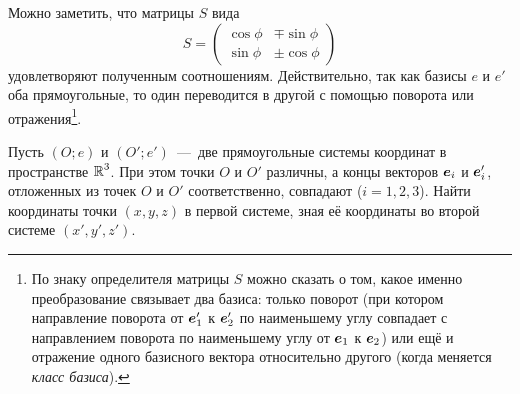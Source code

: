 \documentclass[a4paper,12pt]{article}
\begin{document}
\begin{solution}
    Можно заметить, что матрицы $S$ вида
    \[
      S = \begin{pmatrix}
        \cos \phi & \mp \sin \phi\\
        \sin \phi & \pm \cos \phi
      \end{pmatrix}
    \]
    удовлетворяют полученным соотношениям.
    Действительно, так как базисы $e$ и $e'$ оба прямоугольные, то один переводится в другой с помощью поворота или отражения\footnote{По знаку определителя матрицы $S$ можно сказать о том, какое именно преобразование связывает два базиса: только поворот (при котором направление поворота от $\boldsymbol e_1'$ к $\boldsymbol e_2'$ по наименьшему углу совпадает с направлением поворота по наименьшему углу от $\boldsymbol e_1$ к $\boldsymbol e_2$) или ещё и отражение одного базисного вектора относительно другого (когда меняется \emph{класс базиса}).}.
  \end{solution}
  
  
  \begin{problem}[4.30]
    Пусть $(O; e)$ и $(O'; e')$~---~две прямоугольные системы координат в пространстве $\operatorname{\mathbb R}^3$.
    При этом точки $O$ и $O'$ различны, а концы векторов $\boldsymbol e_i$ и $\boldsymbol e_i'$, отложенных из точек $O$ и $O'$ соответственно, совпадают ($i = 1, 2, 3$).
    Найти координаты точки $(x, y, z)$ в первой системе, зная её координаты во второй системе $(x', y', z')$.
  \end{problem}
  
\end{document}
